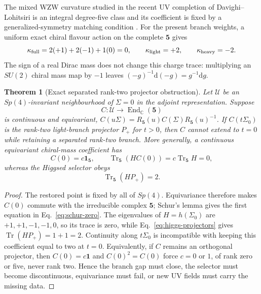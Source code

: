 \documentclass[11pt]{article}
\newtheorem{theorem}{Theorem}[section]
\theoremstyle{definition}
\theoremstyle{remark}
\newcommand{\dd}{\mathrm d}
\newcommand{\CC}{\mathbb C}
\newcommand{\Tr}{\operatorname{Tr}}
\begin{document}
The mixed WZW curvature studied in the recent UV completion of
Davighi--Lohitsiri is an integral degree-five class and its coefficient is
fixed by a generalized-symmetry matching condition
\cite{DavighiLohitsiri2024}.  For the present branch weights, a uniform
exact chiral flavour action on the complete \(\bm5\) gives
\begin{equation}
 \kappa_{\rm full}=2(+1)+2(-1)+1(0)=0,
 \qquad
 \kappa_{\rm light}=+2,\qquad
 \kappa_{\rm heavy}=-2.
 \label{eq:charge-trace}
\end{equation}
The sign of a real Dirac mass does not change this charge trace: multiplying
an \(SU(2)\) chiral mass map by \(-1\) leaves
\(({-g})^{-1}\dd(-g)=g^{-1}\dd g\).

\begin{theorem}[Exact separated rank-two projector obstruction]
Let \(\mathcal U\) be an \(Sp(4)\)-invariant neighbourhood of
\(\Sigma=0\) in the adjoint representation.  Suppose
\[
 C:\mathcal U\longrightarrow\operatorname{End}_{\CC}(\bm5)
\]
is continuous and equivariant,
\(C(u\Sigma)=R_{\bm5}(u)C(\Sigma)R_{\bm5}(u)^{-1}\).
If \(C(t\Sigma_0)\) is the rank-two light-branch projector \(P_+\) for
\(t>0\), then \(C\) cannot extend to \(t=0\) while retaining a separated
rank-two branch.  More generally, a continuous equivariant chiral-mass
coefficient has
\begin{equation}
 C(0)=c\bm1_{\bm5},\qquad
 \Tr_{\bm5}\!\left(HC(0)\right)=c\Tr_{\bm5}H=0,
 \label{eq:schur-zero}
\end{equation}
whereas the Higgsed selector obeys
\begin{equation}
 \Tr_{\bm5}(HP_+)=2.
 \label{eq:projector-trace-two}
\end{equation}
\end{theorem}
\begin{proof}
The restored point is fixed by all of \(Sp(4)\).  Equivariance therefore
makes \(C(0)\) commute with the irreducible complex \(\bm5\); Schur's lemma
gives the first equation in Eq.~\eqref{eq:schur-zero}.  The eigenvalues of
\(H=h(\Sigma_0)\) are \(+1,+1,-1,-1,0\), so its trace is zero, while
Eq.~\eqref{eq:higgs-projectors} gives
\(\Tr(HP_+)=1+1=2\).  Continuity along \(t\Sigma_0\) is incompatible with
keeping this coefficient equal to two at \(t=0\).  Equivalently, if \(C\)
remains an orthogonal projector, then \(C(0)=c\bm1\) and \(C(0)^2=C(0)\)
force \(c=0\) or \(1\), of rank zero or five, never rank two.  Hence the
branch gap must close, the selector must become discontinuous, equivariance
must fail, or new UV fields must carry the missing data.
\end{proof}
\end{document}
